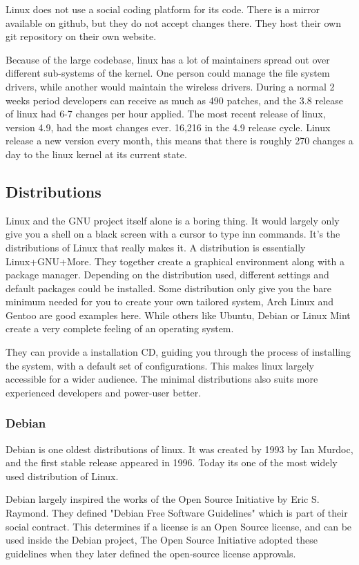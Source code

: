 \documentclass[12pt]{article}
\begin{document}
Linux does not use a social coding platform for its code. There is a mirror
available on github, but they do not accept changes there. They host their own
git repository on their own website.

Because of the large codebase, linux has a lot of maintainers spread out over
different sub-systems of the kernel. One person could manage the file system
drivers, while another would maintain the wireless drivers. During a normal
2 weeks period developers can receive as much as 490 patches, and the 3.8 release
of linux had 6-7 changes per hour applied. The most recent release of linux,
version 4.9, had the most changes ever. 16,216 in the 4.9 release cycle. Linux
release a new version every month, this means that there is roughly 270 changes
a day to the linux kernel at its current state\cite{linux-49}.

\subsection{Distributions}
Linux and the GNU project itself alone is a boring thing. It would largely only
give you a shell on a black screen with a cursor to type inn commands. It's the
distributions of Linux that really makes it. A distribution is essentially
Linux+GNU+More. They together create a graphical environment along with a
package manager. Depending on the distribution used, different settings and
default packages could be installed. Some distribution only give you the bare
minimum needed for you to create your own tailored system, Arch Linux and Gentoo
are good examples here. While others like Ubuntu, Debian or Linux Mint create a
very complete feeling of an operating system.

They can provide a installation CD, guiding you through the process of
installing the system, with a default set of configurations. This makes linux
largely accessible for a wider audience. The minimal distributions also suits
more experienced developers and power-user better.

\subsubsection{Debian}
Debian is one oldest distributions of linux. It was created by 1993 by Ian
Murdoc, and the first stable release appeared in 1996. Today its one of the most
widely used distribution of Linux.\cite{debian}

Debian largely inspired the works of the Open Source Initiative by Eric S.
Raymond. They defined "Debian Free Software Guidelines" which is part of their
social contract. This determines if a license is an Open Source license, and can
be used inside the Debian project, The Open Source Initiative adopted these
guidelines when they later defined the open-source license approvals.
\end{document}
